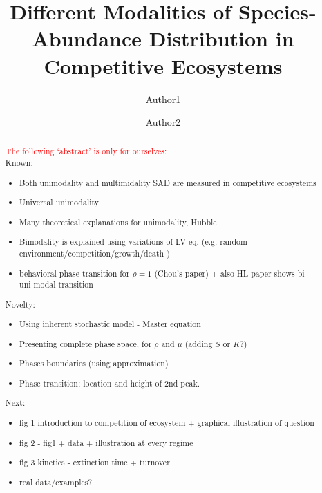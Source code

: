 \documentclass[%
 amsmath,amssymb,
 reprint,%
]{revtex4-2}
\begin{document}

\title{Different Modalities of Species-Abundance Distribution in Competitive Ecosystems}


\author{Author1}
%
\author{Author2}
%



\begin{abstract}
\textcolor{red}{The following `abstract' is only for ourselves:} \\
Known:
\begin{itemize}
    \item Both unimodality and multimidality SAD are measured in competitive ecosystems
    \item Universal unimodality 
    \item Many theoretical explanations for unimodality, Hubble 
    \item Bimodality is explained using variations of LV eq.  (e.g. random environment/competition/growth/death ) 
    \item behavioral phase transition for $\rho=1$ (Chou's paper) + also HL paper shows bi-uni-modal transition 
\end{itemize}
Novelty:
\begin{itemize}
    \item Using inherent stochastic model - Master equation 
    \item Presenting complete phase space, for $\rho$ and $\mu$ (adding $S$ or $K$?)  
    \item Phases boundaries (using approximation)  
    \item Phase transition; location and height of 2nd peak.  
\end{itemize}
Next:
\begin{itemize}
    \item fig 1 introduction to competition of ecosystem
    + graphical illustration of question
    \item fig 2 - fig1 + data + illustration at every regime
    \item fig 3 kinetics - extinction time + turnover
    \item real data/examples?
\end{itemize}
\end{abstract}
\end{document}
